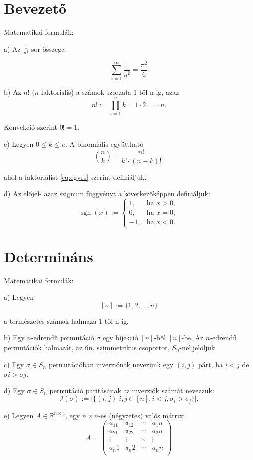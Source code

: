 \documentclass{article}
\begin{document}
\section{Bevezető}
Matematikai formulák: 

a) Az $\frac{1}{n^2} $ sor összege:

\[\sum_{i=1}^\infty\frac{1}{n^2}=\frac{\pi^2}{6}\]

b) Az $n!$ ($n$ faktoriális) a számok szorzata 1-től n-ig, azaz
\begin{equation}
n! := \prod_{i=1}^n k = 1 \cdot 2 \cdot \ldots \cdot n\text{.}
\label{eq:egyes}
\end{equation}

Konvekció szerint $0! = 1$.

c) Legyen $0 \leq k \leq n$. A binomiális együttható
\[\binom{n}{k} = \frac{n!}{k! \cdot (n-k)!}\text{,}\]

ahol a faktoriálist \eqref{eq:egyes} szerint definiáljuk.

d) Az előjel- azaz szignum függvényt a következőképpen definiáljuk:
\[\operatorname{sgn}(x) := \begin{cases}
1, & \text{ha } x > 0, \\
0, & \text{ha } x = 0, \\
-1, & \text{ha } x < 0.
\end{cases}\]

\section{Determináns}
Matematikai formulák: 

a) Legyen
\[[n] := \lbrace1, 2, \ldots, n\rbrace\]

a természetes számok halmaza 1-től n-ig.

b) Egy $n$-edrendű $\text{permutáció }\sigma$ egy bijekció $[n]$-ből $[n]$-be. Az $n$-edrendű permutációk halmazát, az ún. szimmetrikus csoportot, $S_n$-nel jelöljük.

c) Egy $\sigma \in S_n$ permutációban inverziónak nevezünk egy $(i, j)$ párt, ha $i < j$
de $\sigma i > \sigma j$.

d) Egy $\sigma \in S_n$ permutáció paritásának az inverziók számát nevezzük:
\[ \mathcal{I}(\sigma) := \vert\lbrace(i, j) \vert i, j \in [n], i < j, \sigma_i > \sigma_j \rbrace\vert.\]

e) Legyen $A \in \mathbb{R}^{n \times n} \text{, egy }n \times n$-es (négyzetes) valós mátrix:
\[ A = \left( \begin{matrix}
a_11 & a_12 & \cdots & a_1n \\
a_21 & a_22 & \cdots & a_2n \\
\vdots & \vdots & \ddots & \vdots \\
a_n1 & a_n2 & \cdots & a_nn \\
\end{matrix} \right) \]
\end{document}

